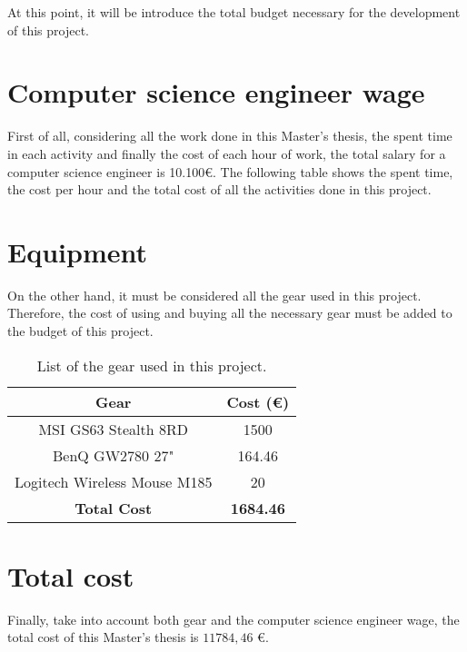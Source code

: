 At this point, it will be introduce the total budget necessary for the development of this project.

\section{Computer science engineer wage}
First of all, considering all the work done in this Master's thesis, the spent time in each activity and finally the cost of each hour of work, the total salary for a computer science engineer is 10.100\euro{}. The following table shows the spent time, the cost per hour and the total cost of all the activities done in this project.

\begin{table}[!h]
\centering
{}
\caption{Description of the work done and its cost.}
\label{my-label}
\end{table}

\newpage
\section{Equipment}
On the other hand, it must be considered all the gear used in this project. Therefore, the cost of using and buying all the necessary gear must be added to the budget of this project.
\begin{table}[!h]
\centering
\begin{tabular}{cc}
\hline
\multicolumn{1}{|c|}{\textbf{Gear}} & \multicolumn{1}{c|}{\textbf{Cost (\euro{})}} \\ \hline
\multicolumn{1}{|c|}{MSI GS63 Stealth 8RD} & \multicolumn{1}{c|}{1500} \\ \hline
\multicolumn{1}{|c|}{BenQ GW2780 27"} & \multicolumn{1}{c|}{164.46} \\ \hline
\multicolumn{1}{|c|}{Logitech Wireless Mouse M185} & \multicolumn{1}{c|}{20} \\ \hline
\textbf{Total Cost} & \textbf{1684.46}
\end{tabular}
\caption{List of the gear used in this project.}
\label{my-label}
\end{table}

\section{Total cost}
Finally, take into account both gear and the computer science engineer wage, the total cost of this Master's thesis is $11784,46$ \euro{}.